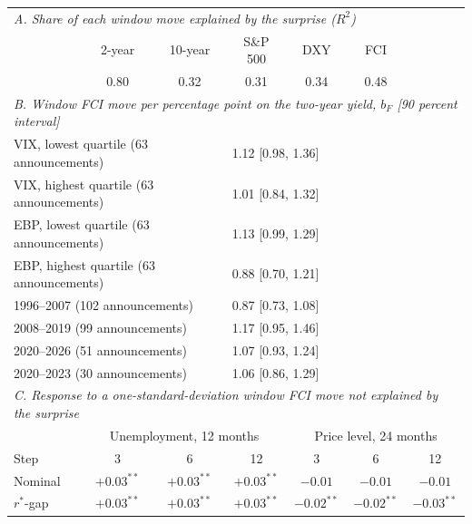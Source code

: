 \begin{tabular}{lcccccc}\toprule
\multicolumn{7}{l}{\textit{A. Share of each window move explained by the surprise ($R^2$)}}\\
 & 2-year & 10-year & S\&P 500 & DXY & FCI & \\
 & 0.80 & 0.32 & 0.31 & 0.34 & 0.48 & \\\midrule
\multicolumn{7}{l}{\textit{B. Window FCI move per percentage point on the two-year yield, $b_F$ [90 percent interval]}}\\
\multicolumn{3}{l}{VIX, lowest quartile (63 announcements)} & \multicolumn{4}{l}{1.12 [0.98, 1.36]}\\
\multicolumn{3}{l}{VIX, highest quartile (63 announcements)} & \multicolumn{4}{l}{1.01 [0.84, 1.32]}\\
\multicolumn{3}{l}{EBP, lowest quartile (63 announcements)} & \multicolumn{4}{l}{1.13 [0.99, 1.29]}\\
\multicolumn{3}{l}{EBP, highest quartile (63 announcements)} & \multicolumn{4}{l}{0.88 [0.70, 1.21]}\\
\multicolumn{3}{l}{1996--2007 (102 announcements)} & \multicolumn{4}{l}{0.87 [0.73, 1.08]}\\
\multicolumn{3}{l}{2008--2019 (99 announcements)} & \multicolumn{4}{l}{1.17 [0.95, 1.46]}\\
\multicolumn{3}{l}{2020--2026 (51 announcements)} & \multicolumn{4}{l}{1.07 [0.93, 1.24]}\\
\multicolumn{3}{l}{2020--2023 (30 announcements)} & \multicolumn{4}{l}{1.06 [0.86, 1.29]}\\
\midrule
\multicolumn{7}{l}{\textit{C. Response to a one-standard-deviation window FCI move not explained by the surprise}}\\
 & \multicolumn{3}{c}{Unemployment, 12 months} & \multicolumn{3}{c}{Price level, 24 months}\\
Step & 3 & 6 & 12 & 3 & 6 & 12\\
Nominal & $+0.03^{**}$ & $+0.03^{**}$ & $+0.03^{**}$ & $-0.01$ & $-0.01$ & $-0.01$\\
$r^*$-gap & $+0.03^{**}$ & $+0.03^{**}$ & $+0.03^{**}$ & $-0.02^{**}$ & $-0.02^{**}$ & $-0.03^{**}$\\
\bottomrule\end{tabular}
